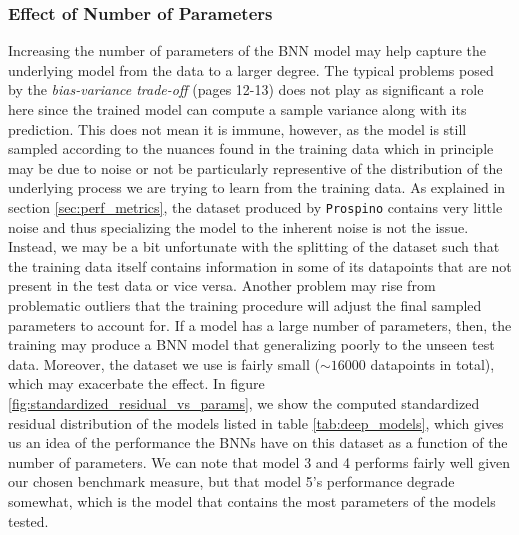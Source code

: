 \subsubsection{Effect of Number of Parameters}
Increasing the number of parameters of the BNN model may help capture the underlying model from the data to a larger degree. The typical problems posed by the \textit{bias-variance trade-off} \cite{ml_for_physicists} (pages 12-13) does not play as significant a role here since the trained model can compute a sample variance along with its prediction. This does not mean it is immune, however, as the model is still sampled according to the nuances found in the training data which in principle may be due to noise or not be particularly representive of the distribution of the underlying process we are trying to learn from the training data. As explained in section \ref{sec:perf_metrics}, the dataset produced by {\tt Prospino} contains very little noise and thus specializing the model to the inherent noise is not the issue. Instead, we may be a bit unfortunate with the splitting of the dataset such that the training data itself contains information in some of its datapoints that are not present in the test data or vice versa. Another problem may rise from problematic outliers that the training procedure will adjust the final sampled parameters to account for. If a model has a large number of parameters, then, the training may produce a BNN model that generalizing poorly to the unseen test data. Moreover, the dataset we use is fairly small ($\sim 16000$ datapoints in total), which may exacerbate the effect. 
In figure \ref{fig:standardized_residual_vs_params}, we show the computed standardized residual distribution of the models listed in table \ref{tab:deep_models}, which gives us an idea of the performance the BNNs have on this dataset as a function of the number of parameters. We can note that model 3 and 4 performs fairly well given our chosen benchmark measure, but that model 5's performance degrade somewhat, which is the model that contains the most parameters of the models tested. 

